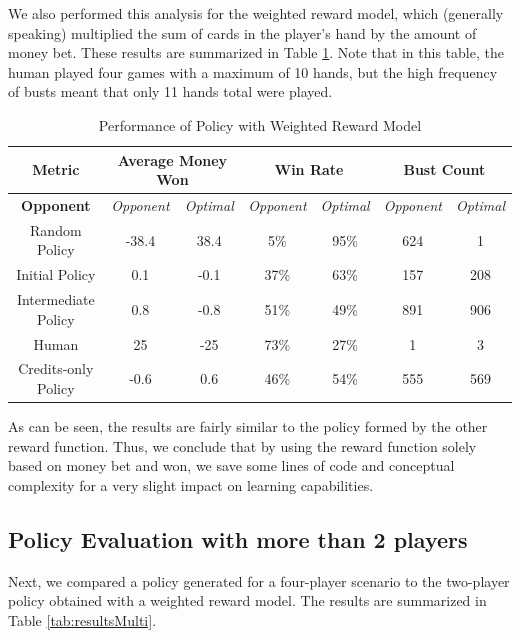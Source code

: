 \documentclass{article}
\begin{document}
We also performed this analysis for the weighted reward model, which (generally speaking) multiplied the sum of cards in the player's hand by the amount of money bet. These results are summarized in Table \ref{tab:results2}. Note that in this table, the human played four games with a maximum of 10 hands, but the high frequency of busts meant that only 11 hands total were played.

\begin{table}[H]
\centering
\caption{Performance of Policy with Weighted Reward Model}
\begin{tabular}{ c | c | c | c | c | c | c }
 \textbf{Metric} & \multicolumn{2}{|c|}{\textbf{Average Money Won}} & \multicolumn{2}{|c|}{\textbf{Win Rate}} & \multicolumn{2}{|c}{\textbf{Bust Count}} \\ \hline 
 \textbf{Opponent}  & \textit{Opponent} & \textit{Optimal} & \textit{Opponent} & \textit{Optimal} & \textit{Opponent} & \textit{Optimal} \\ \hline
 Random Policy & -38.4 & 38.4 & 5\% & 95\% & 624 & 1 \\
 Initial Policy & 0.1 & -0.1 & 37\% & 63\% & 157 & 208 \\
 Intermediate Policy & 0.8 & -0.8 & 51\% & 49\% & 891 & 906 \\
 Human & 25 & -25 & 73\% & 27\% & 1 & 3 \\ 
Credits-only Policy & -0.6 & 0.6 & 46\% & 54\% & 555 & 569 \\
\end{tabular}
\label{tab:results2}
\end{table}

As can be seen, the results are fairly similar to the policy formed by the other reward function. Thus, we conclude that by using the reward function solely based on money bet and won, we save some lines of code and conceptual complexity for a very slight impact on learning capabilities.
\subsection{Policy Evaluation with more than 2 players}

Next, we compared a policy generated for a four-player scenario to the two-player policy obtained with a weighted reward model. The results are summarized in Table \ref{tab:resultsMulti}.
\end{document}
